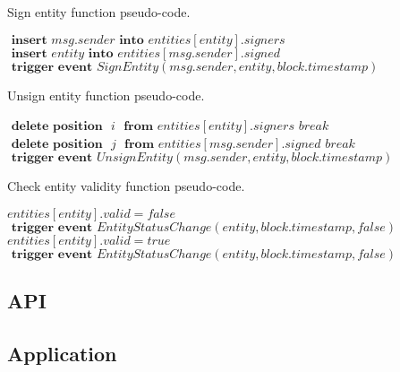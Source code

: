 \begin{algorithm}
  \caption{Sign entity function pseudo-code.}
  \label{alg:sign-entity}
  \begin{algorithmic}[1]
      \State $\textbf{ insert } msg.sender \textbf{ into } entities[entity].signers$
      \State $\textbf{ insert } entity \textbf{ into } entities[msg.sender].signed$
      \State $\textbf{ trigger event } SignEntity(msg.sender, entity, block.timestamp)$
      \State {}
    \EndFunction
  \end{algorithmic}
\end{algorithm}

\begin{algorithm}
  \caption{Unsign entity function pseudo-code.}
  \label{alg:unsign-entity}
  \begin{algorithmic}[1]
          \State $\textbf{ delete position } \textit{ i } \textbf{ from } entities[entity].signers$
          \State $break$
        \EndIf
      \EndFor
      \State
          \State $\textbf{ delete position } \textit{ j }\textbf{ from } entities[msg.sender].signed$
          \State $break$
        \EndIf
      \EndFor
      \State
      \State $\textbf{ trigger event } UnsignEntity(msg.sender, entity, block.timestamp)$
    \EndFunction
  \end{algorithmic}
\end{algorithm}

\begin{algorithm}
  \caption{Check entity validity function pseudo-code.}
  \label{alg:check-entity-validity}
  \begin{algorithmic}[1]
      \State $entities[entity].valid = false$
        \State {}
      \EndFor
      \State $\textbf{ trigger event } EntityStatusChange(entity, block.timestamp, false)$
    \EndIf
    \State
      \State $entities[entity].valid = true$
        \State {}
      \EndFor
      \State $\textbf{ trigger event } EntityStatusChange(entity, block.timestamp, false)$
    \EndIf
    \EndFunction
  \end{algorithmic}
\end{algorithm}


\subsection{API}

\subsection{Application}
